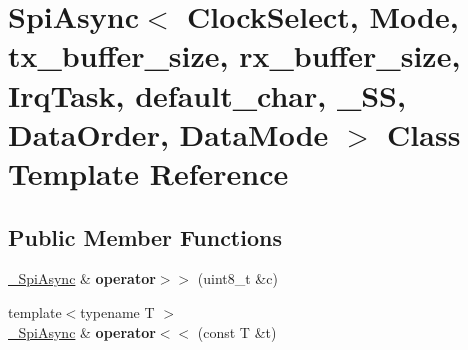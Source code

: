 \hypertarget{classSpiAsync}{}\section{Spi\+Async$<$ Clock\+Select, Mode, tx\+\_\+buffer\+\_\+size, rx\+\_\+buffer\+\_\+size, Irq\+Task, default\+\_\+char, \+\_\+\+SS, Data\+Order, Data\+Mode $>$ Class Template Reference}
\label{classSpiAsync}
\subsection*{Public Member Functions}
\begin{DoxyCompactItemize}
\item 
\hyperlink{classSpiAsync}{\+\_\+\+Spi\+Async} \& {\bfseries operator$>$$>$} (uint8\+\_\+t \&c)\hypertarget{classSpiAsync_a9a44b080f0db081901bb96f1c2b12eec}{}\label{classSpiAsync_a9a44b080f0db081901bb96f1c2b12eec}

\item 
{\footnotesize template$<$typename T $>$ }\\\hyperlink{classSpiAsync}{\+\_\+\+Spi\+Async} \& {\bfseries operator$<$$<$} (const T \&t)\hypertarget{classSpiAsync_ac3736126fbedcccdbe524a565056d15b}{}\label{classSpiAsync_ac3736126fbedcccdbe524a565056d15b}

\end{DoxyCompactItemize}

